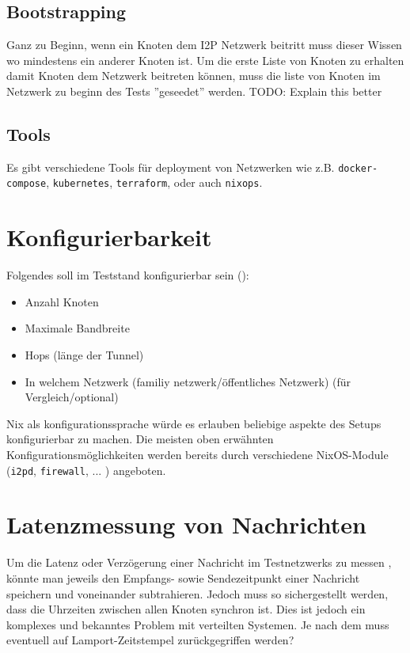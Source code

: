 \subsection{Bootstrapping}

Ganz zu Beginn, wenn ein Knoten dem I2P Netzwerk beitritt muss dieser Wissen wo mindestens ein anderer Knoten ist.
Um die erste Liste von Knoten zu erhalten damit Knoten dem Netzwerk beitreten können, muss die liste von Knoten im Netzwerk zu beginn des Tests ''geseedet'' werden. TODO: Explain this better

\subsection{Tools}

Es gibt verschiedene Tools für deployment von Netzwerken wie z.B. \lstinline|docker-compose|, \lstinline|kubernetes|, \lstinline|terraform|, oder auch \lstinline|nixops|.


\section{Konfigurierbarkeit}

Folgendes soll im Teststand konfigurierbar sein ():

\begin{itemize}
    \item Anzahl Knoten
    \item Maximale Bandbreite
    \item Hops (länge der Tunnel)
    \item In welchem Netzwerk (familiy netzwerk/öffentliches Netzwerk) (für Vergleich/optional)
\end{itemize}

Nix als konfigurationssprache würde es erlauben beliebige aspekte des Setups konfigurierbar zu machen.
Die meisten oben erwähnten Konfigurationsmöglichkeiten werden bereits durch verschiedene NixOS-Module (\lstinline|i2pd|, \lstinline|firewall|, ... ) angeboten.

\section{Latenzmessung von Nachrichten}

Um die Latenz oder Verzögerung einer Nachricht im Testnetzwerks zu messen , könnte man jeweils den Empfangs- sowie Sendezeitpunkt einer Nachricht speichern und voneinander subtrahieren.
Jedoch muss so sichergestellt werden, dass die Uhrzeiten zwischen allen Knoten synchron ist.
Dies ist jedoch ein komplexes und bekanntes Problem mit verteilten Systemen.
Je nach dem muss eventuell auf Lamport-Zeitstempel zurückgegriffen werden?

